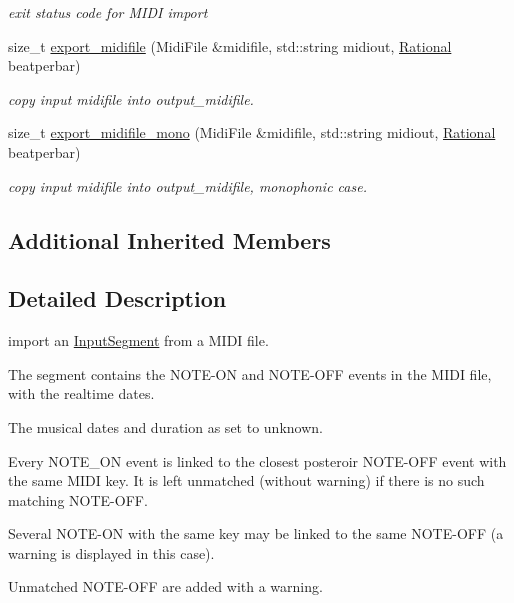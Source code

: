 \begin{DoxyCompactItemize}
\begin{DoxyCompactList}\small\item\em exit status code for M\+I\+DI import \end{DoxyCompactList}\item 
size\+\_\+t \mbox{\hyperlink{classInputSegmentMIDI_a6c0b140ef054db3d0669ffbb11c8c29b}{export\+\_\+midifile}} (Midi\+File \&midifile, std\+::string midiout, \mbox{\hyperlink{classRational}{Rational}} beatperbar)
\begin{DoxyCompactList}\small\item\em copy input midifile into output\+\_\+midifile. \end{DoxyCompactList}\item 
size\+\_\+t \mbox{\hyperlink{classInputSegmentMIDI_af2ac856f11e5ebbca039e988e0df0d9d}{export\+\_\+midifile\+\_\+mono}} (Midi\+File \&midifile, std\+::string midiout, \mbox{\hyperlink{classRational}{Rational}} beatperbar)
\begin{DoxyCompactList}\small\item\em copy input midifile into output\+\_\+midifile, monophonic case. \end{DoxyCompactList}\end{DoxyCompactItemize}
\subsection*{Additional Inherited Members}


\subsection{Detailed Description}
import an \mbox{\hyperlink{classInputSegment}{Input\+Segment}} from a M\+I\+DI file. 


\begin{DoxyItemize}
\item The segment contains the N\+O\+T\+E-\/\+ON and N\+O\+T\+E-\/\+O\+FF events in the M\+I\+DI file, with the realtime dates.
\item The musical dates and duration as set to unknown.
\item Every N\+O\+T\+E\+\_\+\+ON event is linked to the closest posteroir N\+O\+T\+E-\/\+O\+FF event with the same M\+I\+DI key. It is left unmatched (without warning) if there is no such matching N\+O\+T\+E-\/\+O\+FF.
\item Several N\+O\+T\+E-\/\+ON with the same key may be linked to the same N\+O\+T\+E-\/\+O\+FF (a warning is displayed in this case).
\item Unmatched N\+O\+T\+E-\/\+O\+FF are added with a warning. 
\end{DoxyItemize}

